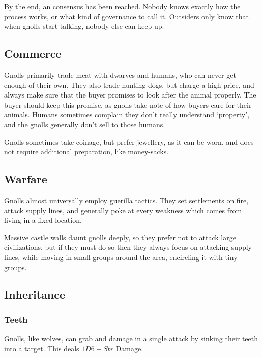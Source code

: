 \begin{multicols}{2}
By the end, an consensus has been reached.
Nobody knows exactly how the process works, or what kind of governance to call it.
Outsiders only know that when gnolls start talking, nobody else can keep up.

\subsection{Commerce}

Gnolls primarily trade meat with dwarves and humans, who can never get enough of their own.
They also trade hunting dogs, but charge a high price, and always make sure that the buyer promises to look after the animal properly.
The buyer should keep this promise, as gnolls take note of how buyers care for their animals.
Humans sometimes complain they don't really understand `property', and the gnolls generally don't sell to those humans.

Gnolls sometimes take coinage, but prefer jewellery, as it can be worn, and does not require additional preparation, like money-sacks.

\subsection{Warfare}

Gnolls almost universally employ guerilla tactics.
They set settlements on fire, attack supply lines, and generally poke at every weakness which comes from living in a fixed location.

Massive castle walls daunt gnolls deeply, so they prefer not to attack large civilizations, but if they must do so then they always focus on attacking supply lines, while moving in small groups around the area, encircling it with tiny groups.

\subsection{Inheritance}

\subsubsection[Teeth: grab and grapple in a single manoeuvre]{Teeth}
\label{gnollishInheritance}

Gnolls, like wolves, can grab and damage in a single attack by sinking their teeth into a target.
This deals $1D6 + Str$ Damage.


\subsubsection{}


\end{multicols}
